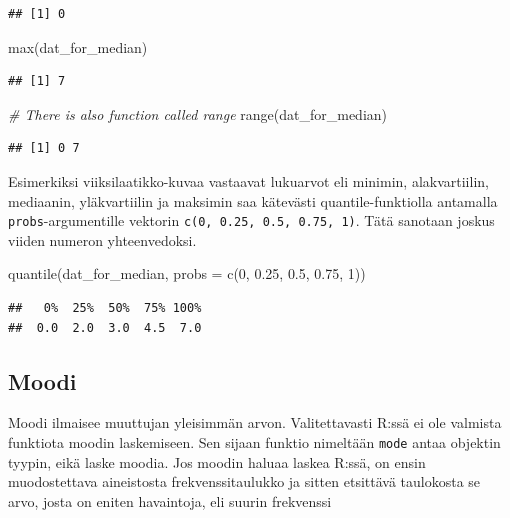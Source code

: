 \documentclass[
]{book}
\newenvironment{Shaded}{\begin{snugshade}}{\end{snugshade}}
\newcommand{\AttributeTok}[1]{\textcolor[rgb]{0.77,0.63,0.00}{#1}}
\newcommand{\CommentTok}[1]{\textcolor[rgb]{0.56,0.35,0.01}{\textit{#1}}}
\newcommand{\DecValTok}[1]{\textcolor[rgb]{0.00,0.00,0.81}{#1}}
\newcommand{\FloatTok}[1]{\textcolor[rgb]{0.00,0.00,0.81}{#1}}
\newcommand{\FunctionTok}[1]{\textcolor[rgb]{0.00,0.00,0.00}{#1}}
\newcommand{\NormalTok}[1]{#1}
\begin{document}
\begin{verbatim}
## [1] 0
\end{verbatim}

\begin{Shaded}
\begin{Highlighting}[]
\FunctionTok{max}\NormalTok{(dat\_for\_median)}
\end{Highlighting}
\end{Shaded}

\begin{verbatim}
## [1] 7
\end{verbatim}

\begin{Shaded}
\begin{Highlighting}[]
\CommentTok{\# There is also function called range}
\FunctionTok{range}\NormalTok{(dat\_for\_median)}
\end{Highlighting}
\end{Shaded}

\begin{verbatim}
## [1] 0 7
\end{verbatim}

Esimerkiksi viiksilaatikko-kuvaa vastaavat lukuarvot eli minimin, alakvartiilin, mediaanin, yläkvartiilin ja maksimin saa kätevästi quantile-funktiolla antamalla \texttt{probs}-argumentille vektorin \texttt{c(0,\ 0.25,\ 0.5,\ 0.75,\ 1)}. Tätä sanotaan joskus viiden numeron yhteenvedoksi.

\begin{Shaded}
\begin{Highlighting}[]
\FunctionTok{quantile}\NormalTok{(dat\_for\_median, }\AttributeTok{probs =} \FunctionTok{c}\NormalTok{(}\DecValTok{0}\NormalTok{, }\FloatTok{0.25}\NormalTok{, }\FloatTok{0.5}\NormalTok{, }\FloatTok{0.75}\NormalTok{, }\DecValTok{1}\NormalTok{))}
\end{Highlighting}
\end{Shaded}

\begin{verbatim}
##   0%  25%  50%  75% 100% 
##  0.0  2.0  3.0  4.5  7.0
\end{verbatim}

\hypertarget{moodi}{%
\subsection{Moodi}\label{moodi}}

Moodi ilmaisee muuttujan yleisimmän arvon. Valitettavasti R:ssä ei ole valmista funktiota moodin laskemiseen. Sen sijaan funktio nimeltään \texttt{mode} antaa objektin tyypin, eikä laske moodia. Jos moodin haluaa laskea R:ssä, on ensin muodostettava aineistosta frekvenssitaulukko ja sitten etsittävä taulokosta se arvo, josta on eniten havaintoja, eli suurin frekvenssi
\end{document}
